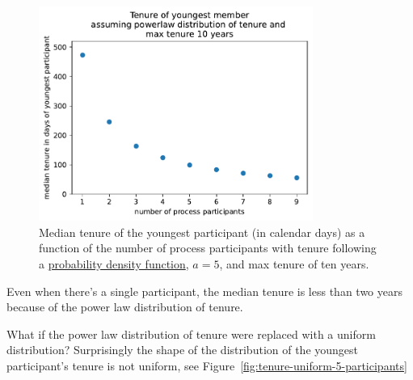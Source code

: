\begin{figure}[!htb]  %
    \centering
    \includegraphics[width=0.8\textwidth]{images/tenure_power_distribution_a5_with_max_tenure10.pdf}
    \caption{Median tenure of the youngest participant (in calendar days) as a function of the number of process participants with tenure following a 
    \href{https://en.wikipedia.org/wiki/Probability_density_function}{probability density function},
    $a=5$, and max tenure of ten years.}
    \label{fig:tenure-powerlaw-5-participants}
\end{figure}


Even when there's a single participant, the median tenure is less than two years because of the power law distribution of tenure.

What if the power law distribution of tenure were replaced with a uniform distribution?
Surprisingly the shape of the distribution of the youngest participant's tenure is not uniform, see Figure~\ref{fig:tenure-uniform-5-participants}


